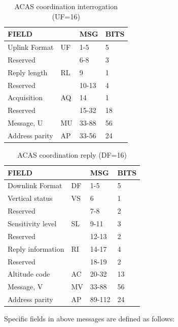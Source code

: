 \begin{table}[ht]
  \centering
  \caption{ACAS coordination interrogation (UF=16)}
  \label{tb:acas_uf_16}
  \begin{tabular}[t]{|l|l|l|l|}
  \hline
  \textbf{FIELD} & \textbf{} & \textbf{MSG} & \textbf{BITS} \\ \hline
  Uplink Format & UF & 1-5 & 5 \\ \hline
  Reserved &  & 6-8 & 3 \\ \hline
  Reply length & RL & 9 & 1 \\ \hline
  Reserved &  & 10-13 & 4 \\ \hline
  Acquisition & AQ & 14 & 1 \\ \hline
  Reserved &  & 15-32 & 18 \\ \hline
  Message, U & MU & 33-88 & 56 \\ \hline
  Address parity & AP & 33-56 & 24 \\ \hline
  \end{tabular}
\end{table}%

\begin{table}[ht]
  \centering
  \caption{ACAS coordination reply (DF=16)}
  \label{tb:acas_df_16}
  \begin{tabular}[t]{|l|l|l|l|}
  \hline
  \textbf{FIELD} & \textbf{} & \textbf{MSG} & \textbf{BITS} \\ \hline
  Downlink Format & DF & 1-5 & 5 \\ \hline
  Vertical status & VS & 6 & 1 \\ \hline
  Reserved &  & 7-8 & 2 \\ \hline
  Sensitivity level & SL & 9-11 & 3 \\ \hline
  Reserved &  & 12-13 & 2 \\ \hline
  Reply information & RI & 14-17 & 4 \\ \hline
  Reserved &  & 18-19 & 2 \\ \hline
  Altitude code & AC & 20-32 & 13 \\ \hline
  Message, V & MV & 33-88 & 56 \\ \hline
  Address parity & AP & 89-112 & 24 \\ \hline
  \end{tabular}
\end{table}


Specific fields in above messages are defined as follows:


